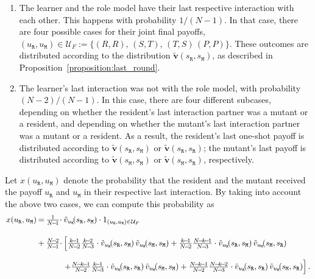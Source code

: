 \documentclass[11pt]{article}
\def\resident{\texttt{R}}
\def\mutant{\texttt{M}}
\def\strategy{s}
\theoremstyle{plainCl1}
\theoremstyle{plainCl2}
\begin{document}
\begin{enumerate}
\item The learner and the role model have their last respective interaction with each other. This happens with probability $1/(N\!-\!1)$. In that case, there are four possible cases for their joint final payoffs, $(u_\resident,u_\mutant)\!\in\!\mathcal{U}_F\!:=\!\big\{(R,R),\,(S,T),\,(T,S)\,(P,P)\big\}$. These outcomes are distributed according to the distribution $\mathbf{\tilde{v}}(\strategy_\resident,\strategy_\mutant)$, as described in Proposition~\ref{proposition:last_round}.  
\item The learner's last interaction was not with the role model, with probability $(N\!-\!2)/(N\!-\!1)$. In this case, there are four different subcases, depending on whether the resident's last interaction partner was a mutant or a resident, and depending on whether the mutant's last interaction partner was a mutant or a resident. As a result, the resident's last one-shot payoff is distributed according to $\mathbf{\tilde{v}}(\strategy_\resident,\strategy_\mutant)$ or $\mathbf{\tilde{v}}(\strategy_\resident,\strategy_\resident)$; the mutant's last payoff is distributed according to $\mathbf{\tilde{v}}(\strategy_\mutant,\strategy_\mutant)$ or $\mathbf{\tilde{v}}(\strategy_\mutant,\strategy_\resident)$, respectively. 
\end{enumerate}

\noindent
Let $x(u_\resident,u_\mutant)$ denote the probability that the resident and the mutant received the payoff $u_\resident$ and $u_\mutant$ in their respective last interaction.  
By taking into account the above two cases, we can compute this probability as
\begin{equation}\label{eq:Chi} 
\setlength{\arraycolsep}{1pt} 
\begin{array}{llll}
x(u_\resident,u_\mutant)	 &=
&\frac{1}{N\!-\!1}\cdot  &\tilde v_{u_\resident}\!(\strategy_\resident,\strategy_\mutant)\cdot 1_{(u_\resident,u_\mutant)\in \mathcal{U}_F}\\[0.5cm]
&+	
&\frac{N\!-\!2}{N\!-\!1} \cdot 
&\left[ \frac{k\!-\!1}{N\!-\!2}\frac{k\!-\!2}{N\!-\!3}\cdot \tilde v_{u_\resident}\!(\strategy_\resident,\strategy_\mutant) \,\tilde v_{u_\mutant}\!(\strategy_\mutant,\strategy_\mutant) + 
 \frac{k\!-\!1}{N\!-\!2}\frac{N\!-\!k\!-\!1}{N\!-\!3}\cdot \tilde v_{u_\resident}\!(\strategy_\resident,\strategy_\mutant) \,\tilde v_{u_\mutant}\!(\strategy_\mutant,\strategy_\resident)\right.\\[0.5cm]
&&&\left. +\frac{N\!-\!k\!-\!1}{N\!-\!2}\frac{k\!-\!1}{N\!-\!3} \cdot \tilde v_{u_\resident}\!(\strategy_\resident,\strategy_\resident) \, \tilde v_{u_\mutant}\!(\strategy_\mutant,\strategy_\mutant) + 
 \frac{N\!-\!k\!-\!1}{N\!-\!2}\frac{N\!-\!k\!-\!2}{N\!-\!3} \cdot \tilde v_{u_\resident}\!(\strategy_\resident,\strategy_\resident) \, \tilde v_{u_\mutant}\!(\strategy_\mutant,\strategy_\resident)\right].
\end{array}
\end{equation}
\end{document}
